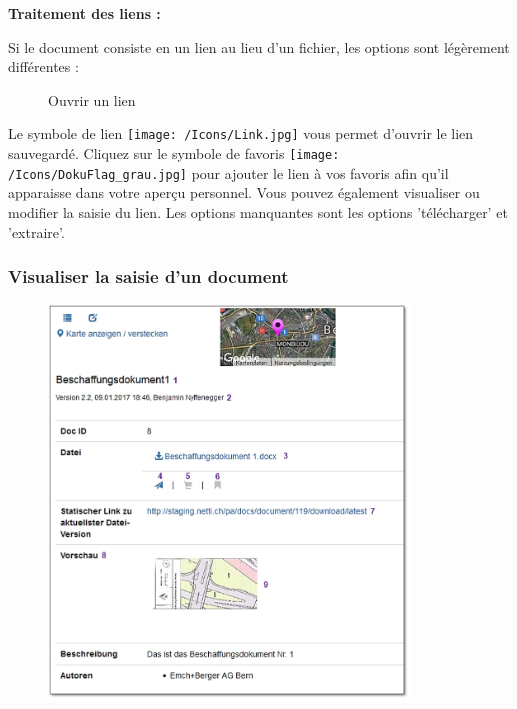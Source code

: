 \textbf{Traitement des liens :}

Si le document consiste en un lien au lieu d'un fichier, les options sont légèrement différentes :

\begin{figure}[H]
\caption{Ouvrir un lien}
\end{figure}

Le symbole de lien \texttt{[image: /Icons/Link.jpg]}  vous permet d'ouvrir le lien sauvegardé. Cliquez sur le symbole de favoris \texttt{[image: /Icons/DokuFlag\_grau.jpg]}  pour ajouter le lien à vos favoris afin qu'il apparaisse dans votre aperçu personnel. Vous pouvez également visualiser ou modifier la saisie du lien. Les options manquantes sont les options 'télécharger' et 'extraire'.


\pagebreak
\subsubsection{Visualiser la saisie d'un document}
\label{bkm:Ref443047930}

\begin{figure}
\vspace{-15pt}
\includegraphics[height=105mm]{../chapters/11_Dokumentenablage/pictures/11-2-5_Dokumentenansicht.jpg}
\end{figure}

